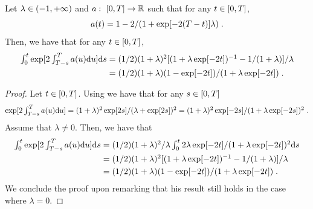   \begin{lemma}
  \label{lemma:integral_exp_uno}
  Let $\lambda \in \left(-1, +\infty\right)$ and $a: \ \left[0,T\right] \to \mathbb{R}$ such
  that for any $t \in \left[0,T\right]$,
  \begin{equation}
    a(t) = 1 - 2/(1 + \exp[-2(T-t)]\lambda) \; . 
  \end{equation}
  Then,  we have that for any $t \in \left[0,T\right]$,
  \begin{align}
      \textstyle{\int_0^t \exp[ 2\int_{T-s}^T a(u) \mathrm{d}u] \mathrm{d}s} &=     \textstyle{(1/2)(1+\lambda)^2 [(1 + \lambda \exp[-2t])^{-1} - 1/(1+\lambda)]/\lambda} \\
      &= \textstyle{(1/2)(1+\lambda)  (1 -  \exp[-2t])/(1 + \lambda \exp[-2t])  } \; . 
    \end{align}
  \end{lemma}

  \begin{proof}
    Let $t \in \left[0,T\right]$. Using  we have that for any $s \in \left[0,T\right]$
    \begin{equation}
      \textstyle{ \exp[2\int_{T-s}^T a(u) \mathrm{d}u] = (1+\lambda)^2 \exp[2s] / (\lambda + \exp[2s])^2 = (1+\lambda)^2 \exp[-2s]/(1 + \lambda \exp[-2s])^2 \;.} 
    \end{equation}
    Assume that $\lambda \neq 0$. Then, we have that
    \begin{align}
      \textstyle{\int_0^t \exp[2\int_{T-s}^T a(u) \mathrm{d}u] \mathrm{d}s } &= \textstyle{(1/2)(1+\lambda)^2/\lambda\int_0^t 2 \lambda \exp[-2t]/(1 + \lambda \exp[-2t])^2 \mathrm{d}s} \\
                                                                  &= \textstyle{(1/2)(1+\lambda)^2 [(1 + \lambda \exp[-2t])^{-1} - 1/(1+\lambda)]/\lambda  } \\
      &= \textstyle{(1/2)(1+\lambda)  (1 -  \exp[-2t])/(1 + \lambda \exp[-2t])  } \; .
    \end{align}
    We conclude the proof upon remarking that his result still holds in the case where $\lambda =0$.
  \end{proof}

